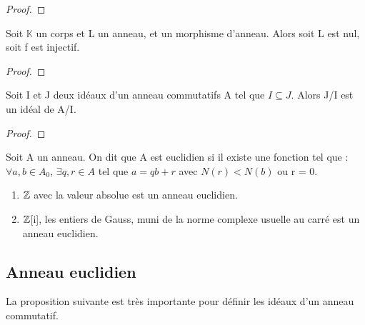 \begin{proof}
	
\end{proof}

\begin{corollary}
	Soit $\mathbb{K}$ un corps et L un anneau, et
	 un morphisme d'anneau. Alors soit L est nul,
	soit f est injectif.
\end{corollary}

\begin{proof}
	
\end{proof}

\begin{proposition}
	Soit I et J deux idéaux d'un anneau commutatifs A tel que $I \subseteq J$.
	Alors J/I est un idéal de A/I.
\end{proposition}

\begin{proof}
	
\end{proof}

\begin{definition}
	Soit A un anneau. On dit que A est euclidien si il existe une fonction
	 tel que : $\forall a, b \in A_{0}$, $\exists q,
	r \in A$ tel que $a = qb + r$ avec $N(r) < N(b)$ ou r = 0.
\end{definition}

\begin{exemple}
	\begin{enumerate}
		\item $\mathbb{Z}$ avec la valeur absolue est un anneau euclidien.
		\item $\mathbb{Z}$[i], les entiers de Gauss, muni de la norme complexe
			usuelle au carré est un anneau euclidien.
	\end{enumerate}
\end{exemple}

\subsection{Anneau euclidien}

La proposition suivante est très importante pour définir les idéaux d'un anneau
commutatif.

\begin{definition} 
	
\end{definition}

